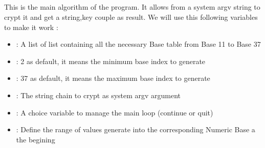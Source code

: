 \documentclass[letterpaper,10pt,english]{sphinxmanual}
\begin{document}
\subsection{}
\label{\detokenize{Description of Crypterv1:algorithm}}
\sphinxAtStartPar
This is the main algorithm of the program.
It allows from a system argv string to crypt it and get a string,key couple as result.
We will use this following variables to make it work :
\begin{itemize}
\item {} 
\sphinxAtStartPar
{} : A list of list containing all the necessary Base table from Base 11 to Base 37

\item {} 
\sphinxAtStartPar
{} : 2 as default, it means the minimum base index to generate

\item {} 
\sphinxAtStartPar
{} :  37 as default, it means the maximum base index to generate

\item {} 
\sphinxAtStartPar
{} : The string chain to crypt as system argv argument

\item {} 
\sphinxAtStartPar
{} : A choice variable to manage the main loop (continue or quit)

\item {} 
\sphinxAtStartPar
{} : Define the range of values generate into the corresponding Numeric Base a the begining

\end{itemize}
\end{document}
